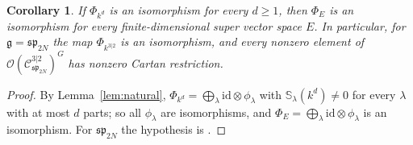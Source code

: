 \documentclass[11pt]{article}
\newtheorem{corollary}[theorem]{Corollary}
\theoremstyle{definition}
\newcommand{\g}{\mathfrak g}
\newcommand{\Cs}{\mathcal C}
\newcommand{\Oo}{\mathcal O}
\newcommand{\Sf}{\mathbb S}
\begin{document}
\begin{corollary}\label{cor:spE}
If $\Phi_{k^d}$ is an isomorphism for every $d\ge1$, then $\Phi_E$ is an isomorphism for every finite-dimensional super vector space $E$. In particular, for $\g=\mathfrak{sp}_{2N}$ the map $\Phi_{k^{3|2}}$ is an isomorphism, and every nonzero element of $\Oo(\Cs^{3|2}_{\mathfrak{sp}_{2N}})^G$ has nonzero Cartan restriction.
\end{corollary}
\begin{proof}
By Lemma~\ref{lem:natural}, $\Phi_{k^d}=\bigoplus_\lambda\mathrm{id}\otimes\phi_\lambda$ with $\Sf_\lambda(k^d)\neq0$ for every $\lambda$ with at most $d$ parts; so all $\phi_\lambda$ are isomorphisms, and $\Phi_E=\bigoplus_\lambda\mathrm{id}\otimes\phi_\lambda$ is an isomorphism. For $\mathfrak{sp}_{2N}$ the hypothesis is \cite[Thm.~4.1]{CN21}.
\end{proof}
\end{document}
